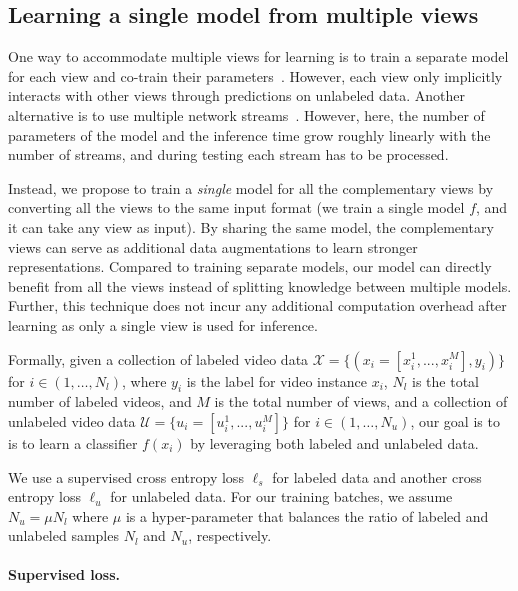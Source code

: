 \documentclass[10pt,twocolumn,letterpaper]{article}
\begin{document}
\subsection{Learning a single model from multiple views} \label{sec:multiview_learning}

One way to accommodate multiple views for learning is to
train a separate model for each view and co-train their parameters~\cite{blum1998combining}. However, each view only implicitly interacts with other views through predictions on unlabeled data. 
Another alternative is to use multiple network streams~\cite{simonyan2014two, feichtenhofer2016convolutional}. However, here, the {number of} parameters of the model and the inference time grow roughly linearly with the number of streams, and during testing each stream has to be processed. 

{Instead,} we propose to train a \textit{single} model for all the complementary views by converting all the views to the same input format (\ie we train a single model $f$, and it can take any view as input). 
By sharing the same model, the complementary views can serve as additional data augmentations to learn stronger representations.
Compared to training separate models, our model can directly benefit from all the views instead of splitting knowledge between multiple models. 
Further, this technique does not incur any additional computation overhead after learning as only a single view is used for inference. 

Formally, given a collection of labeled video data  
$ \mathcal{X} = \big\{(x_i=[x_i^{1},...,x_i^{M}],  y_i)\big\} $ for  $i \in (1,\ldots,N_{l})$, 
where $y_i$ is the label for video instance $x_i$,  
$N_{l}$ is the total number of labeled videos, and $M$ is the total number of views,  and a collection of unlabeled video data  $\mathcal{U} = \big\{u_i =[u_i^{1},...,u_i^{M}]\big\}$ for   $i \in (1,\ldots,N_{u})$, our goal is to  is to learn a classifier $f(x_i)$ by leveraging both labeled and unlabeled data. 




We use a supervised cross entropy loss $\ell_s$ for labeled data  and another cross entropy loss  $\ell_u$ for unlabeled data. 
For our training batches, we assume $N_{u} = \mu N_{l}$ where $\mu$ is a hyper-parameter that balances the ratio of labeled  and unlabeled samples $N_{l}$ and $N_{u}$, respectively.

\paragraph{Supervised loss.} 
\end{document}
